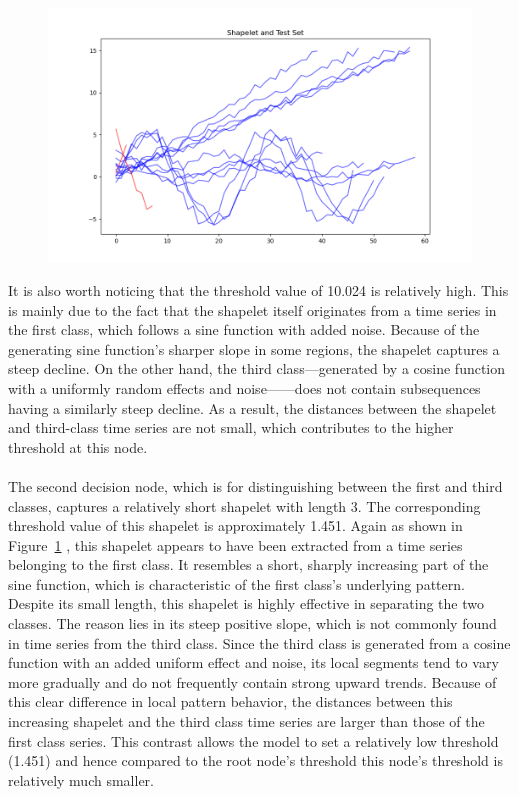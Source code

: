 \begin{figure}[h!]
	\centering
	\includegraphics[width=0.9\linewidth]{../Statistical_Sciences_template/figure/Shapelet and Test Set.png}
	\caption{}
	\label{fig:shapetest}
\end{figure}
It is also worth noticing that the threshold value of 10.024 is relatively high. This is mainly due to the fact that the shapelet itself originates from a time series in the first class, which follows a sine function with added noise. Because of the generating sine function’s sharper slope in some regions, the shapelet captures a steep decline. On the other hand, the third class—generated by a cosine function with a uniformly random effects and noise——does not contain subsequences having a similarly steep decline. As a result, the distances between the shapelet and third-class time series are not small, which contributes to the higher threshold at this node.\\
\\
The second decision node, which is for distinguishing between the first and third classes, captures a relatively short shapelet with length 3. The corresponding threshold value of this shapelet is approximately 1.451. Again as shown in Figure~\ref{fig:shapetest} , this shapelet appears to have been extracted from a time series belonging to the first class. It resembles a short, sharply increasing part of the sine function, which is characteristic of the first class’s underlying pattern. Despite its small length, this shapelet is highly effective in separating the two classes. The reason lies in its steep positive slope, which is not commonly found in time series from the third class. Since the third class is generated from a cosine function with an added uniform effect and noise, its local segments tend to vary more gradually and do not frequently contain strong upward trends. Because of this clear difference in local pattern behavior, the distances between this increasing shapelet and the third class time series are larger than those of the first class series. This contrast allows the model to set a relatively low threshold (1.451) and hence compared to the root node's threshold this node's threshold is relatively much smaller.\\
